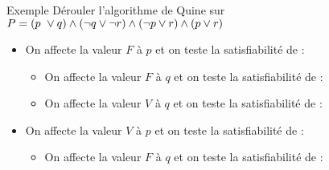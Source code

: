 \documentclass[10pt]{beamer}
\begin{document}
\begin{frame}{\Ctitle}{\stitle}
    \begin{exampleblock}{Exemple}
        Dérouler l'algorithme de Quine sur $P = (p\ \vee q) \wedge (\neg q \vee \neg r) \wedge (\neg p \vee r) \wedge (p \vee r)$
        \begin{itemize}
            \item On affecte la valeur $F$ à $p$ et on teste la satisfiabilité de : \\
            \begin{itemize} 
                \item<5-> On affecte la valeur $F$ à $q$ et on teste la satisfiabilité de : \\
                \item<7-> On affecte la valeur $V$ à $q$ et on teste la satisfiabilité de : \\
            \end{itemize}
            \item<9-> On affecte la valeur $V$ à $p$ et on teste la satisfiabilité de : \\
            \begin{itemize} 
                \item<12-> On affecte la valeur $F$ à $q$ et on teste la satisfiabilité de : \\
            \end{itemize}
        \end{itemize}
    \end{exampleblock}

\end{frame}
\end{document}
